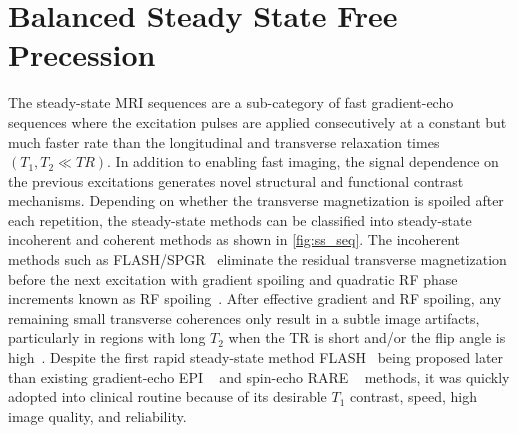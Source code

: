 \section{Balanced Steady State Free Precession}
\label{sec:bSSFP}
The steady-state \gls{MRI} sequences are a sub-category of fast gradient-echo sequences where the excitation pulses are applied consecutively at a constant but much faster rate than the longitudinal and transverse relaxation times $(T_1, T_2 \ll TR)$. In addition to enabling fast imaging, the signal dependence on the previous excitations generates novel structural and functional contrast mechanisms. Depending on whether the transverse magnetization is spoiled after each repetition, the steady-state methods can be classified into steady-state incoherent and coherent methods as shown in \cref{fig:ss_seq}. The incoherent methods such as \gls{FLASH}/\gls{SPGR}~\cite{haaseFLASHImagingRapid1986} eliminate the residual transverse magnetization before the next excitation with gradient spoiling and quadratic \gls{RF} phase increments known as \gls{RF} spoiling~\cite{zurSpoilingTransverseMagnetization1991a,ganterSteadyStateGradient2006}. After effective gradient and \gls{RF} spoiling, any remaining small transverse coherences only result in a subtle image artifacts, particularly in regions with long $T_2$ when the TR is short and/or the flip angle is high~\cite{epsteinSpoilingTransverseMagnetization1996,weinmullerMRZeroMeets2025}. Despite the first rapid steady-state method \gls{FLASH}~\cite{haaseFLASHImagingRapid1986} being proposed later than existing gradient-echo \gls{EPI} ~\cite{mansfieldMultiplanarImageFormation1977} and spin-echo \gls{RARE} ~\cite{hennigRAREImagingFast1986} methods, it was quickly adopted into clinical routine because of its desirable $T_1$ contrast, speed, high image quality, and reliability.
\newline
